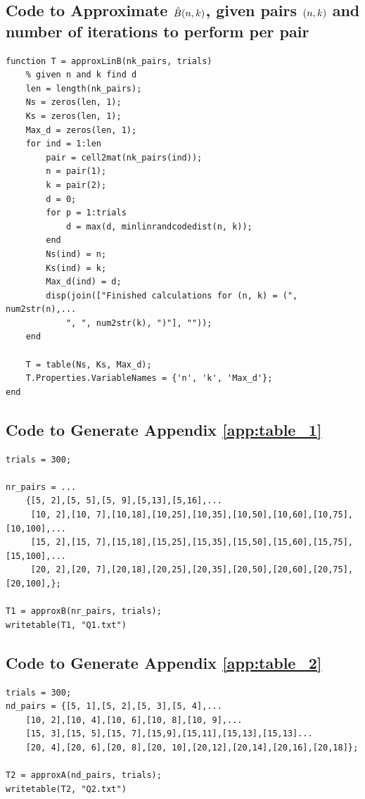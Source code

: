 \documentclass[11pt]{article} %
\let\originalleft\left
\let\originalright\right
\renewcommand{\left}{\mathopen{}\mathclose\bgroup\originalleft}
\renewcommand{\right}{\aftergroup\egroup\originalright}
\begin{document}
\subsection*{Code to Approximate $\hat{B}\left(n, k\right)$, given pairs $\left(n, k\right)$ and number of iterations to perform per pair}
\begin{lstlisting}
function T = approxLinB(nk_pairs, trials)
    % given n and k find d
    len = length(nk_pairs);
    Ns = zeros(len, 1);
    Ks = zeros(len, 1);
    Max_d = zeros(len, 1);
    for ind = 1:len
        pair = cell2mat(nk_pairs(ind));
        n = pair(1);
        k = pair(2);
        d = 0;
        for p = 1:trials
            d = max(d, minlinrandcodedist(n, k));
        end
        Ns(ind) = n;
        Ks(ind) = k;
        Max_d(ind) = d;
        disp(join(["Finished calculations for (n, k) = (", num2str(n),... 
            ", ", num2str(k), ")"], ""));
    end
    
    T = table(Ns, Ks, Max_d);
    T.Properties.VariableNames = {'n', 'k', 'Max_d'};
end
\end{lstlisting}

\subsection*{Code to Generate Appendix \ref{app:table_1}}
\begin{lstlisting}
trials = 300;

nr_pairs = ...
    {[5, 2],[5, 5],[5, 9],[5,13],[5,16],...
     [10, 2],[10, 7],[10,18],[10,25],[10,35],[10,50],[10,60],[10,75],[10,100],...
     [15, 2],[15, 7],[15,18],[15,25],[15,35],[15,50],[15,60],[15,75],[15,100],...
     [20, 2],[20, 7],[20,18],[20,25],[20,35],[20,50],[20,60],[20,75],[20,100],};

T1 = approxB(nr_pairs, trials);
writetable(T1, "Q1.txt")
\end{lstlisting}

\subsection*{Code to Generate Appendix \ref{app:table_2}}
\begin{lstlisting}
trials = 300;
nd_pairs = {[5, 1],[5, 2],[5, 3],[5, 4],...
    [10, 2],[10, 4],[10, 6],[10, 8],[10, 9],...
    [15, 3],[15, 5],[15, 7],[15,9],[15,11],[15,13],[15,13]...
    [20, 4],[20, 6],[20, 8],[20, 10],[20,12],[20,14],[20,16],[20,18]};

T2 = approxA(nd_pairs, trials);
writetable(T2, "Q2.txt")
\end{lstlisting}
\end{document}
